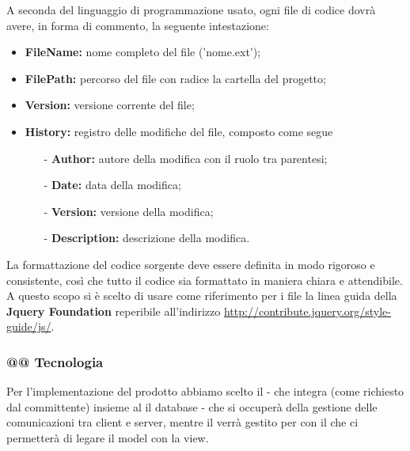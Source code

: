 \documentclass[a4paper,11pt]{article}
\begin{document}
			A seconda del linguaggio di programmazione usato, ogni file di codice dovrà avere, in forma di commento, la seguente intestazione:		
			
		\begin{itemize}
		\item \textbf{FileName:} nome completo del file ('nome.ext');
		\item \textbf{FilePath:} percorso del file con radice la cartella del progetto;
		\item \textbf{Version:} versione corrente del file;
		\item \textbf{History:} registro delle modifiche del file, composto come segue 
			\begin{itemize}
			\item[-] \textbf{Author:} autore della modifica con il ruolo tra parentesi;
			\item[-] \textbf{Date:} data della modifica;
			\item[-] \textbf{Version:} versione della modifica;
			\item[-] \textbf{Description:} descrizione della modifica.
			\end{itemize}	
		\end{itemize}
		
		La formattazione del codice sorgente deve essere definita in modo rigoroso e consistente, così
che tutto il codice sia formattato in maniera chiara e attendibile. A questo scopo si è scelto di usare come riferimento per i file   la linea guida della \textbf{Jquery Foundation} reperibile all'indirizzo \url{http://contribute.jquery.org/style-guide/js/}.
	
	\subsubsection{@@ Tecnologia}
	Per l'implementazione del prodotto abbiamo scelto il  - che integra  (come richiesto dal committente) insieme al il database  - che si occuperà della gestione delle comunicazioni tra client e server, mentre il  verrà gestito per con il   che ci permetterà di legare il model con la view.
	
\end{document}

